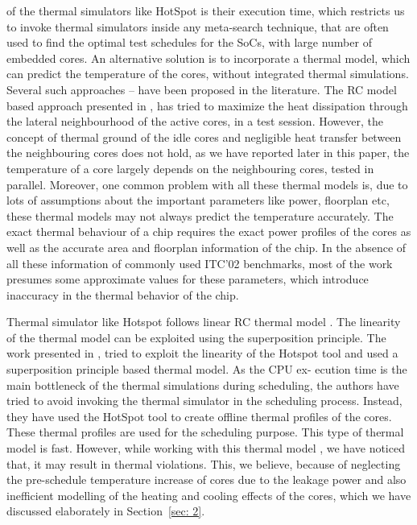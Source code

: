 \documentclass[conference]{IEEEtran}
\begin{document}
of the thermal simulators like HotSpot \cite{stan2003hotspot} is their execution
time, which restricts us to invoke thermal simulators inside any
meta-search technique, that are often used to find the optimal
test schedules for the SoCs, with large number of embedded
cores. An alternative solution is to incorporate a thermal
model, which can predict the temperature of the cores, without
integrated thermal simulations. Several such approaches \cite{yu2007thermal}–
\cite{he2007heuristic} have been proposed in the literature. The RC model based
approach presented in \cite{rosinger2006thermal}, has tried to maximize the heat
dissipation through the lateral neighbourhood of the active
cores, in a test session. However, the concept of thermal
ground of the idle cores and negligible heat transfer between
the neighbouring cores does not hold, as we have reported
later in this paper, the temperature of a core largely depends
on the neighbouring cores, tested in parallel. Moreover, one
common problem with all these thermal models is, due to lots
of assumptions about the important parameters like power,
floorplan etc, these thermal models may not always predict
the temperature accurately. The exact thermal behaviour of a
chip requires the exact power profiles of the cores as well as
the accurate area and floorplan information of the chip. In the
absence of all these information of commonly used ITC’02
benchmarks, most of the work presumes some approximate
values for these parameters, which introduce inaccuracy in the
thermal behavior of the chip.\\
	\par 
	Thermal simulator like Hotspot follows linear RC thermal
model \cite{yao2011power}. The linearity of the thermal model can be exploited
using the superposition principle. The work presented in \cite{yao2011power},
tried to exploit the linearity of the Hotspot tool and used a
superposition principle based thermal model. As the CPU ex-
ecution time is the main bottleneck of the thermal simulations
during scheduling, the authors have tried to avoid invoking the
thermal simulator in the scheduling process. Instead, they have
used the HotSpot \cite{stan2003hotspot} tool to create offline thermal profiles of
the cores. These thermal profiles are used for the scheduling
purpose. This type of thermal model is fast. However, while
working with this thermal model \cite{yao2011power}, we have noticed that,
it may result in thermal violations. This, we believe, because
of neglecting the pre-schedule temperature increase of cores
due to the leakage power and also inefficient modelling of
the heating and cooling effects of the cores, which we have
discussed elaborately in Section~\ref{sec: 2}.\\
\end{document}
